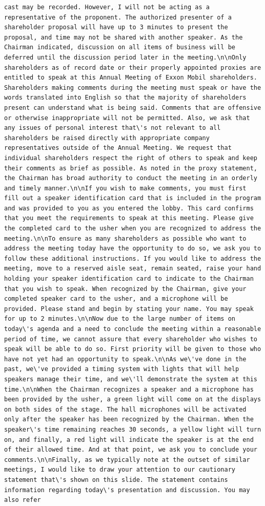 \documentclass[
  letterpaper,
  DIV=11,
  numbers=noendperiod]{scrreprt}
\begin{document}
\begin{verbatim}
cast may be recorded. However, I will not be acting as a representative of the proponent. The authorized presenter of a shareholder proposal will have up to 3 minutes to present the proposal, and time may not be shared with another speaker. As the Chairman indicated, discussion on all items of business will be deferred until the discussion period later in the meeting.\n\nOnly shareholders as of record date or their properly appointed proxies are entitled to speak at this Annual Meeting of Exxon Mobil shareholders. Shareholders making comments during the meeting must speak or have the words translated into English so that the majority of shareholders present can understand what is being said. Comments that are offensive or otherwise inappropriate will not be permitted. Also, we ask that any issues of personal interest that\'s not relevant to all shareholders be raised directly with appropriate company representatives outside of the Annual Meeting. We request that individual shareholders respect the right of others to speak and keep their comments as brief as possible. As noted in the proxy statement, the Chairman has broad authority to conduct the meeting in an orderly and timely manner.\n\nIf you wish to make comments, you must first fill out a speaker identification card that is included in the program and was provided to you as you entered the lobby. This card confirms that you meet the requirements to speak at this meeting. Please give the completed card to the usher when you are recognized to address the meeting.\n\nTo ensure as many shareholders as possible who want to address the meeting today have the opportunity to do so, we ask you to follow these additional instructions. If you would like to address the meeting, move to a reserved aisle seat, remain seated, raise your hand holding your speaker identification card to indicate to the Chairman that you wish to speak. When recognized by the Chairman, give your completed speaker card to the usher, and a microphone will be provided. Please stand and begin by stating your name. You may speak for up to 2 minutes.\n\nNow due to the large number of items on today\'s agenda and a need to conclude the meeting within a reasonable period of time, we cannot assure that every shareholder who wishes to speak will be able to do so. First priority will be given to those who have not yet had an opportunity to speak.\n\nAs we\'ve done in the past, we\'ve provided a timing system with lights that will help speakers manage their time, and we\'ll demonstrate the system at this time.\n\nWhen the Chairman recognizes a speaker and a microphone has been provided by the usher, a green light will come on at the displays on both sides of the stage. The hall microphones will be activated only after the speaker has been recognized by the Chairman. When the speaker\'s time remaining reaches 30 seconds, a yellow light will turn on, and finally, a red light will indicate the speaker is at the end of their allowed time. And at that point, we ask you to conclude your comments.\n\nFinally, as we typically note at the outset of similar meetings, I would like to draw your attention to our cautionary statement that\'s shown on this slide. The statement contains information regarding today\'s presentation and discussion. You may also refer 
\end{verbatim}
\end{document}
